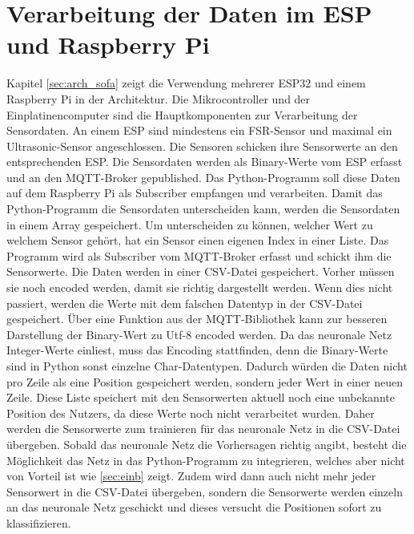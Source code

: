 \section{Verarbeitung der Daten im ESP und Raspberry Pi}
Kapitel \ref{sec:arch_sofa} zeigt die Verwendung mehrerer ESP32 und einem Raspberry Pi in der Architektur. Die Mikrocontroller und der Einplatinencomputer sind die Hauptkomponenten zur Verarbeitung der Sensordaten. An einem ESP sind mindestens ein FSR-Sensor und maximal ein Ultrasonic-Sensor angeschlossen. Die Sensoren schicken ihre Sensorwerte an den entsprechenden ESP. Die Sensordaten werden als Binary-Werte vom ESP erfasst und an den MQTT-Broker gepublished. Das Python-Programm soll diese Daten auf dem Raspberry Pi als Subscriber empfangen und verarbeiten. Damit das Python-Programm die Sensordaten unterscheiden kann, werden die Sensordaten in einem Array gespeichert. Um unterscheiden zu können, welcher Wert zu welchem Sensor gehört, hat ein Sensor einen eigenen Index in einer Liste. Das Programm wird als Subscriber vom MQTT-Broker erfasst und schickt ihm die Sensorwerte. Die Daten werden in einer CSV-Datei gespeichert. Vorher müssen sie noch encoded werden, damit sie richtig dargestellt werden. Wenn dies nicht passiert, werden die Werte mit dem falschen Datentyp in der CSV-Datei gespeichert. Über eine Funktion aus der MQTT-Bibliothek kann zur besseren Darstellung der Binary-Wert zu Utf-8 encoded werden. Da das neuronale Netz Integer-Werte einliest, muss das Encoding stattfinden, denn die Binary-Werte sind in Python sonst einzelne Char-Datentypen. Dadurch würden die Daten nicht pro Zeile als eine Position gespeichert werden, sondern jeder Wert in einer neuen Zeile. Diese Liste speichert mit den Sensorwerten aktuell noch eine unbekannte Position des Nutzers, da diese Werte noch nicht verarbeitet wurden. Daher werden die Sensorwerte zum trainieren für das neuronale Netz in die CSV-Datei übergeben. 
\newline
Sobald das neuronale Netz die Vorhersagen richtig angibt, besteht die Möglichkeit das Netz in das Python-Programm zu integrieren, welches aber nicht von Vorteil ist wie \ref{sec:einb} zeigt. Zudem wird dann auch nicht mehr jeder Sensorwert in die CSV-Datei übergeben, sondern die Sensorwerte werden einzeln an das neuronale Netz geschickt und dieses versucht die Positionen sofort zu klassifizieren. 

